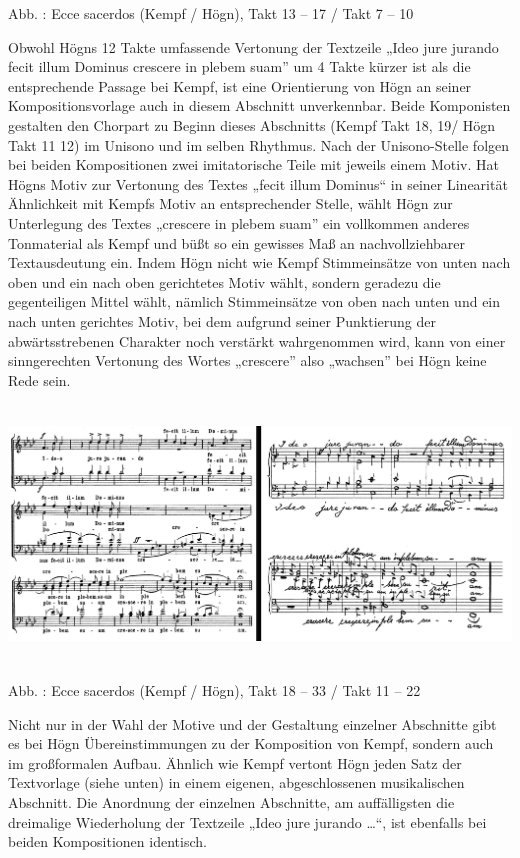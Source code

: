 \documentclass[a4paper]{article}
\newcounter{Abb}
\renewcommand\theAbb{\arabic{Abb}}
\begin{document}
Abb. \stepcounter{Abb}{\theAbb}: Ecce sacerdos (Kempf / Högn), Takt 13 –
17 / Takt 7 – 10

Obwohl Högns 12 Takte umfassende Vertonung der Textzeile „Ideo jure
jurando fecit illum Dominus crescere in plebem suam” um 4 Takte kürzer
ist als die entsprechende Passage bei Kempf, ist eine Orientierung von
Högn an seiner Kompositionsvorlage auch in diesem Abschnitt
unverkennbar. Beide Komponisten gestalten den Chorpart zu Beginn dieses
Abschnitts (Kempf Takt 18, 19/ Högn Takt 11 12) im Unisono und im
selben Rhythmus. Nach der Unisono-Stelle folgen bei beiden
Kompositionen zwei imitatorische Teile mit jeweils einem Motiv. Hat
Högns Motiv zur Vertonung des Textes „fecit illum Dominus“ in seiner
Linearität Ähnlichkeit mit Kempfs Motiv an entsprechender Stelle, wählt
Högn zur Unterlegung des Textes „crescere in plebem suam” ein
vollkommen anderes Tonmaterial als Kempf und büßt so ein gewisses Maß
an nachvollziehbarer Textausdeutung ein. Indem Högn nicht wie Kempf
Stimmeinsätze von unten nach oben und ein nach oben gerichtetes Motiv
wählt, sondern geradezu die gegenteiligen Mittel wählt, nämlich
Stimmeinsätze von oben nach unten und ein nach unten gerichtes Motiv,
bei dem aufgrund seiner Punktierung der abwärtsstrebenen Charakter noch
verstärkt wahrgenommen wird, kann von einer sinngerechten Vertonung des
Wortes „crescere” also „wachsen” bei Högn keine Rede sein.


\includegraphics[width=15.967cm,height=6.828cm]{pictures/zulassungsarbeit-img087.png}


Abb. \stepcounter{Abb}{\theAbb}: Ecce sacerdos (Kempf / Högn), Takt 18 –
 33 / Takt 11 –  22

Nicht nur in der Wahl der Motive und der Gestaltung einzelner Abschnitte
gibt es bei Högn Übereinstimmungen zu der Komposition von Kempf,
sondern auch im großformalen Aufbau. Ähnlich wie Kempf vertont Högn
jeden Satz der Textvorlage (siehe unten) in einem eigenen,
abgeschlossenen musikalischen Abschnitt. Die Anordnung der einzelnen
Abschnitte, am auffälligsten die dreimalige Wiederholung der Textzeile
„Ideo jure jurando …“, ist ebenfalls bei beiden Kompositionen
identisch.
\end{document}
